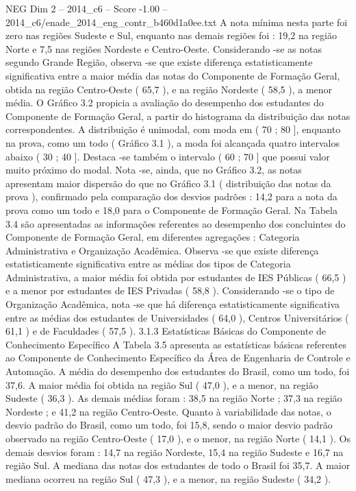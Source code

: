 \begin{textsample}{NEG Dim 2 – 2014\_c6 – Score -1.00 – 2014\_c6/enade\_2014\_eng\_contr\_b460d1a0ee.txt}
A nota mínima nesta parte foi zero nas regiões Sudeste e Sul, enquanto nas demais regiões foi : 19,2 na região Norte e 7,5 nas regiões Nordeste e Centro-Oeste.
Considerando -se as notas segundo Grande Região, observa -se que existe diferença estatisticamente significativa entre a maior média das notas do Componente de Formação Geral, obtida na região Centro-Oeste ( 65,7 ), e na região Nordeste ( 58,5 ), a menor média.
O Gráfico 3.2 propicia a avaliação do desempenho dos estudantes do Componente de Formação Geral, a partir do histograma da distribuição das notas correspondentes.
A distribuição é unimodal, com moda em ( 70 ; 80 ], enquanto na prova, como um todo ( Gráfico 3.1 ), a moda foi alcançada quatro intervalos abaixo ( 30 ; 40 ].
Destaca -se também o intervalo ( 60 ; 70 ] que possui valor muito próximo do modal.
Nota -se, ainda, que no Gráfico 3.2, as notas apresentam maior dispersão do que no Gráfico 3.1 ( distribuição das notas da prova ), confirmado pela comparação dos desvios padrões : 14,2 para a nota da prova como um todo e 18,0 para o Componente de Formação Geral.
Na Tabela 3.4 são apresentadas as informações referentes ao desempenho dos concluintes do Componente de Formação Geral, em diferentes agregações : Categoria Administrativa e Organização Acadêmica.
Observa -se que existe diferença estatisticamente significativa entre as médias dos tipos de Categoria Administrativa, a maior média foi obtida por estudantes de IES Públicas ( 66,5 ) e a menor por estudantes de IES Privadas ( 58,8 ).
Considerando -se o tipo de Organização Acadêmica, nota -se que há diferença estatisticamente significativa entre as médias dos estudantes de Universidades ( 64,0 ), Centros Universitários ( 61,1 ) e de Faculdades ( 57,5 ). 3.1.3 Estatísticas Básicas do Componente de Conhecimento Específico A Tabela 3.5 apresenta as estatísticas básicas referentes ao Componente de Conhecimento Específico da Área de Engenharia de Controle e Automação.
A média do desempenho dos estudantes do Brasil, como um todo, foi 37,6.
A maior média foi obtida na região Sul ( 47,0 ), e a menor, na região Sudeste ( 36,3 ).
As demais médias foram : 38,5 na região Norte ; 37,3 na região Nordeste ; e 41,2 na região Centro-Oeste.
Quanto à variabilidade das notas, o desvio padrão do Brasil, como um todo, foi 15,8, sendo o maior desvio padrão observado na região Centro-Oeste ( 17,0 ), e o menor, na região Norte ( 14,1 ).
Os demais desvios foram : 14,7 na região Nordeste, 15,4 na região Sudeste e 16,7 na região Sul.
A mediana das notas dos estudantes de todo o Brasil foi 35,7.
A maior mediana ocorreu na região Sul ( 47,3 ), e a menor, na região Sudeste ( 34,2 ).

\end{textsample}
